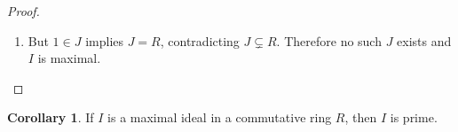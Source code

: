 \documentclass[12pt]{article}
\theoremstyle{definition} %
\newtheorem{corollary}{Corollary}
\theoremstyle{plain} %
\begin{document}
\begin{proof}
\begin{enumerate}
\begin{enumerate}
\begin{enumerate}
  \item (Absorption) For all \(r\in R\) and \(x\in J\), we have 
        \(rx\in J\) (and \(xr\in J\) if \(R\) is not assumed commutative).
\end{enumerate}

\paragraph*{Applying these facts to the proof.}
We were given two elements already in \(J\):
\[
    ab\;\in\;J
    \quad\text{and}\quad
    ab-1\;\in\;J .
\]

\begin{align*}
  \text{Since }J\text{ is additive } &\Rightarrow
    \bigl(ab\bigr) - \bigl(ab-1\bigr)\;\in\;J .
    \\[4pt]
  \text{But } 
    \bigl(ab\bigr) - \bigl(ab-1\bigr) 
    &= ab - ab + 1
      \;=\;1 .
\end{align*}

Therefore
\[
    1\;\in\;J .
\]

\paragraph*{Why \(1\in J\) implies \(J=R\).}
Assume \(1\in J\).  
For \emph{every} element \(r\in R\) we have
\[
   r 
   \;=\; r\cdot 1
   \;\in\; J
   \qquad\text{(by the absorption property).}
\]
Hence \(R\subset J\).  As the reverse inclusion \(J\subset R\) is automatic,
we conclude \(J = R\).

\bigskip
Because this contradicted the standing assumption \(J\subsetneq R\),
no such strictly larger ideal \(J\) can exist; consequently the original
ideal \(I\) must be maximal.
\end{enumerate}

Thus \(1\in J\), which forces \(J=R\) (because any ideal containing \(1\) is the whole ring).  
This contradicts the assumption \(J\subsetneq R\), so no such \(J\) exists and \(I\) is maximal.
    \item But \(1\in J\) implies \(J=R\), contradicting \(J\subsetneq R\).
          Therefore no such \(J\) exists and \(I\) is maximal.
  \end{enumerate}
\end{proof}

\begin{corollary}
  If \(I\) is a maximal ideal in a commutative ring \(R\), then \(I\) is prime.
\end{corollary}
\end{document}
